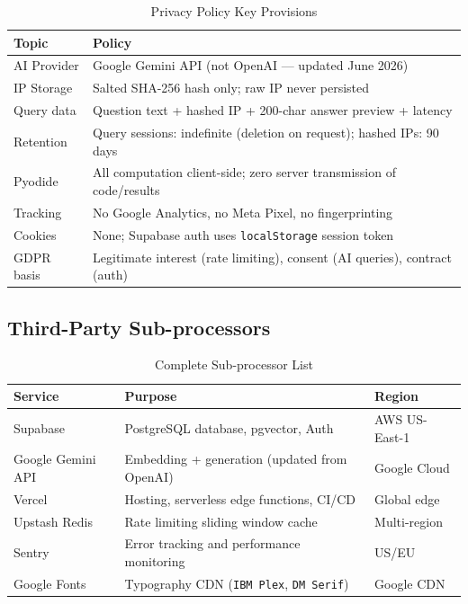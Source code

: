 \documentclass[12pt, a4paper]{article}
\begin{document}
\begin{table}[H]
  \centering
  \caption{Privacy Policy Key Provisions}
  \small
  \begin{tabularx}{\textwidth}{l X}
    \toprule
    \textbf{Topic} & \textbf{Policy} \\
    \midrule
    AI Provider & Google Gemini API (not OpenAI — updated June 2026) \\
    IP Storage & Salted SHA-256 hash only; raw IP never persisted \\
    Query data & Question text + hashed IP + 200-char answer preview + latency \\
    Retention & Query sessions: indefinite (deletion on request); hashed IPs: 90 days \\
    Pyodide & All computation client-side; zero server transmission of code/results \\
    Tracking & No Google Analytics, no Meta Pixel, no fingerprinting \\
    Cookies & None; Supabase auth uses \texttt{localStorage} session token \\
    GDPR basis & Legitimate interest (rate limiting), consent (AI queries), contract (auth) \\
    \bottomrule
  \end{tabularx}
\end{table}

\subsection{Third-Party Sub-processors}

\begin{table}[H]
  \centering
  \caption{Complete Sub-processor List}
  \small
  \begin{tabularx}{\textwidth}{l X l}
    \toprule
    \textbf{Service} & \textbf{Purpose} & \textbf{Region} \\
    \midrule
    Supabase & PostgreSQL database, pgvector, Auth & AWS US-East-1 \\
    Google Gemini API & Embedding + generation (updated from OpenAI) & Google Cloud \\
    Vercel & Hosting, serverless edge functions, CI/CD & Global edge \\
    Upstash Redis & Rate limiting sliding window cache & Multi-region \\
    Sentry & Error tracking and performance monitoring & US/EU \\
    Google Fonts & Typography CDN (\texttt{IBM Plex}, \texttt{DM Serif}) & Google CDN \\
    \bottomrule
  \end{tabularx}
\end{table}
\end{document}
